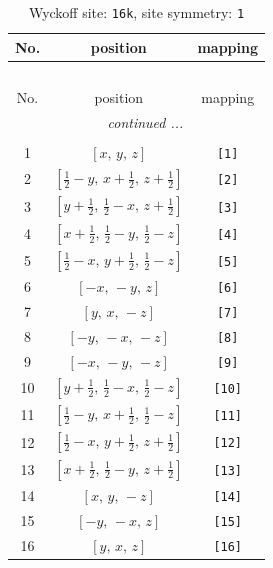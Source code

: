 \documentclass[fleqn,8pt]{jsarticle}
\begin{document}
\begin{longtable}{ccc}
\caption{Wyckoff site: {\tt 16k}, site symmetry: {\tt 1}}
 \\
 \hline \hline
No. & position & mapping \\ \hline \endfirsthead

\multicolumn{2}{l}{\tablename\ \thetable{}} \\
 \hline \hline
No. & position & mapping \\ \hline \endhead

 \hline \hline
\multicolumn{2}{r}{\footnotesize\it continued ...} \\ \endfoot

 \hline \hline
\multicolumn{2}{r}{} \\ \endlastfoot

1 & $\left[ x,\, y,\, z \right]$ & {\tt [1]} \\ \hline
2 & $\left[ \frac{1}{2} - y,\, x + \frac{1}{2},\, z + \frac{1}{2} \right]$ & {\tt [2]} \\ \hline
3 & $\left[ y + \frac{1}{2},\, \frac{1}{2} - x,\, z + \frac{1}{2} \right]$ & {\tt [3]} \\ \hline
4 & $\left[ x + \frac{1}{2},\, \frac{1}{2} - y,\, \frac{1}{2} - z \right]$ & {\tt [4]} \\ \hline
5 & $\left[ \frac{1}{2} - x,\, y + \frac{1}{2},\, \frac{1}{2} - z \right]$ & {\tt [5]} \\ \hline
6 & $\left[ - x,\, - y,\, z \right]$ & {\tt [6]} \\ \hline
7 & $\left[ y,\, x,\, - z \right]$ & {\tt [7]} \\ \hline
8 & $\left[ - y,\, - x,\, - z \right]$ & {\tt [8]} \\ \hline
9 & $\left[ - x,\, - y,\, - z \right]$ & {\tt [9]} \\ \hline
10 & $\left[ y + \frac{1}{2},\, \frac{1}{2} - x,\, \frac{1}{2} - z \right]$ & {\tt [10]} \\ \hline
11 & $\left[ \frac{1}{2} - y,\, x + \frac{1}{2},\, \frac{1}{2} - z \right]$ & {\tt [11]} \\ \hline
12 & $\left[ \frac{1}{2} - x,\, y + \frac{1}{2},\, z + \frac{1}{2} \right]$ & {\tt [12]} \\ \hline
13 & $\left[ x + \frac{1}{2},\, \frac{1}{2} - y,\, z + \frac{1}{2} \right]$ & {\tt [13]} \\ \hline
14 & $\left[ x,\, y,\, - z \right]$ & {\tt [14]} \\ \hline
15 & $\left[ - y,\, - x,\, z \right]$ & {\tt [15]} \\ \hline
16 & $\left[ y,\, x,\, z \right]$ & {\tt [16]} \\
\end{longtable}
\end{document}
